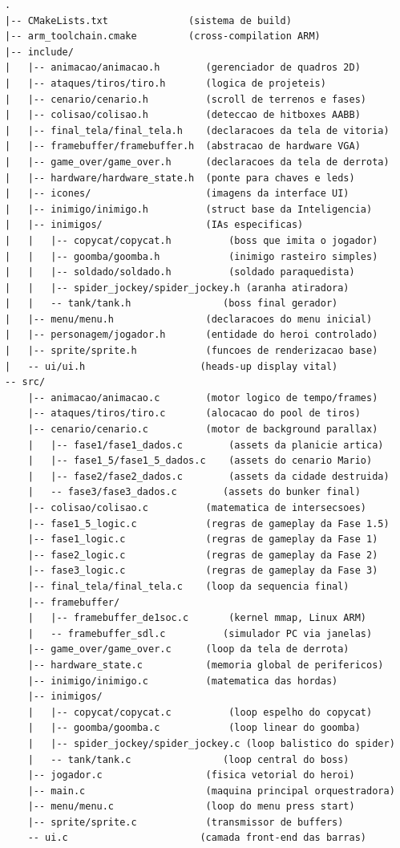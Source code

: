 \documentclass[10pt,twocolumn,letterpaper]{article}
\begin{document}
\begin{lstlisting}[language={}, numbers=none, frame=single,
    basicstyle=\ttfamily\scriptsize, columns=fixed]
.
|-- CMakeLists.txt              (sistema de build)
|-- arm_toolchain.cmake         (cross-compilation ARM)
|-- include/
|   |-- animacao/animacao.h        (gerenciador de quadros 2D)
|   |-- ataques/tiros/tiro.h       (logica de projeteis)
|   |-- cenario/cenario.h          (scroll de terrenos e fases)
|   |-- colisao/colisao.h          (deteccao de hitboxes AABB)
|   |-- final_tela/final_tela.h    (declaracoes da tela de vitoria)
|   |-- framebuffer/framebuffer.h  (abstracao de hardware VGA)
|   |-- game_over/game_over.h      (declaracoes da tela de derrota)
|   |-- hardware/hardware_state.h  (ponte para chaves e leds)
|   |-- icones/                    (imagens da interface UI)
|   |-- inimigo/inimigo.h          (struct base da Inteligencia)
|   |-- inimigos/                  (IAs especificas)
|   |   |-- copycat/copycat.h          (boss que imita o jogador)
|   |   |-- goomba/goomba.h            (inimigo rasteiro simples)
|   |   |-- soldado/soldado.h          (soldado paraquedista)
|   |   |-- spider_jockey/spider_jockey.h (aranha atiradora)
|   |   -- tank/tank.h                (boss final gerador)
|   |-- menu/menu.h                (declaracoes do menu inicial)
|   |-- personagem/jogador.h       (entidade do heroi controlado)
|   |-- sprite/sprite.h            (funcoes de renderizacao base)
|   -- ui/ui.h                    (heads-up display vital)
-- src/
    |-- animacao/animacao.c        (motor logico de tempo/frames)
    |-- ataques/tiros/tiro.c       (alocacao do pool de tiros)
    |-- cenario/cenario.c          (motor de background parallax)
    |   |-- fase1/fase1_dados.c        (assets da planicie artica)
    |   |-- fase1_5/fase1_5_dados.c    (assets do cenario Mario)
    |   |-- fase2/fase2_dados.c        (assets da cidade destruida)
    |   -- fase3/fase3_dados.c        (assets do bunker final)
    |-- colisao/colisao.c          (matematica de intersecsoes)
    |-- fase1_5_logic.c            (regras de gameplay da Fase 1.5)
    |-- fase1_logic.c              (regras de gameplay da Fase 1)
    |-- fase2_logic.c              (regras de gameplay da Fase 2)
    |-- fase3_logic.c              (regras de gameplay da Fase 3)
    |-- final_tela/final_tela.c    (loop da sequencia final)
    |-- framebuffer/
    |   |-- framebuffer_de1soc.c       (kernel mmap, Linux ARM)
    |   -- framebuffer_sdl.c          (simulador PC via janelas)
    |-- game_over/game_over.c      (loop da tela de derrota)
    |-- hardware_state.c           (memoria global de perifericos)
    |-- inimigo/inimigo.c          (matematica das hordas)
    |-- inimigos/
    |   |-- copycat/copycat.c          (loop espelho do copycat)
    |   |-- goomba/goomba.c            (loop linear do goomba)
    |   |-- spider_jockey/spider_jockey.c (loop balistico do spider)
    |   -- tank/tank.c                (loop central do boss)
    |-- jogador.c                  (fisica vetorial do heroi)
    |-- main.c                     (maquina principal orquestradora)
    |-- menu/menu.c                (loop do menu press start)
    |-- sprite/sprite.c            (transmissor de buffers)
    -- ui.c                       (camada front-end das barras)
\end{lstlisting}
\end{document}
